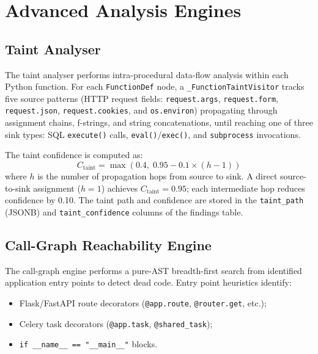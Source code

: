 \section{Advanced Analysis Engines}
\label{sec:advanced_engines}

\subsection{Taint Analyser}
\label{subsec:taint}

The taint analyser performs intra-procedural data-flow analysis within each Python function. For each \texttt{FunctionDef} node, a \texttt{\_FunctionTaintVisitor} tracks five source patterns (HTTP request fields: \texttt{request.args}, \texttt{request.form}, \texttt{request.json}, \texttt{request.cookies}, and \texttt{os.environ}) propagating through assignment chains, f-strings, and string concatenations, until reaching one of three sink types: SQL \texttt{execute()} calls, \texttt{eval()}/\texttt{exec()}, and \texttt{subprocess} invocations.

The taint confidence is computed as:
\begin{equation}
  C_{\text{taint}} = \max(0.4, \; 0.95 - 0.1 \times (h - 1))
  \label{eq:taint_conf}
\end{equation}
where $h$ is the number of propagation hops from source to sink. A direct source-to-sink assignment ($h=1$) achieves $C_{\text{taint}} = 0.95$; each intermediate hop reduces confidence by 0.10. The taint path and confidence are stored in the \texttt{taint\_path} (JSONB) and \texttt{taint\_confidence} columns of the findings table.

\subsection{Call-Graph Reachability Engine}
\label{subsec:callgraph}

The call-graph engine performs a pure-AST breadth-first search from identified application entry points to detect dead code. Entry point heuristics identify:
\begin{itemize}
  \item Flask/FastAPI route decorators (\texttt{@app.route}, \texttt{@router.get}, etc.);
  \item Celery task decorators (\texttt{@app.task}, \texttt{@shared\_task});
  \item \texttt{if \_\_name\_\_ == "\_\_main\_\_"} blocks.
\end{itemize}

